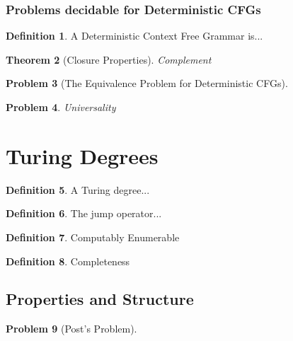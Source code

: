 \documentclass[psamsfonts]{amsart}
\newtheorem{thm}{Theorem}[section]
\newtheorem{prob}[thm]{Problem}
\theoremstyle{definition}
\newtheorem{defn}[thm]{Definition}
\theoremstyle{remark}
\numberwithin{equation}{section}
\begin{document}
\subsubsection{Problems decidable for Deterministic CFGs}
\cite{ginsburg65:_deter}
\begin{defn}
  A Deterministic Context Free Grammar is...
  \cite{sipser13:_introd_theor_comput}
\end{defn}

\begin{thm}[Closure Properties]
  \cite{sipser13:_introd_theor_comput}
  Complement
\end{thm}

\begin{prob}[The Equivalence Problem for Deterministic CFGs]
\cite{senizergues_det_pd_decid}
\end{prob}

\begin{prob}
  Universality
\end{prob}


\section{Turing Degrees}
\begin{defn}
  A Turing degree...
\cite{post44:_recur}
\cite{kleene54_upper_semi_lattic_degrees_recur_unsol}
\end{defn}

\begin{defn}
  The jump operator...
  
\end{defn}

\begin{defn}
  Computably Enumerable
\end{defn}

\begin{defn}
  Completeness
\end{defn}

\subsection{Properties and Structure}
\begin{prob}[Post's Problem]
  \cite{post44:_recur}
  \cite{Friedberg236}
\end{prob}
\end{document}
